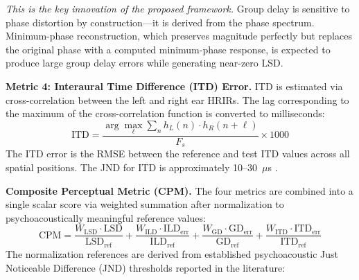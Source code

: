 \documentclass[12pt,a4paper]{article}
\begin{document}
\textit{This is the key innovation of the proposed framework.} Group delay is sensitive to phase distortion by construction---it is derived from the phase spectrum. Minimum-phase reconstruction, which preserves magnitude perfectly but replaces the original phase with a computed minimum-phase response, is expected to produce large group delay errors while generating near-zero LSD.

\textbf{Metric 4: Interaural Time Difference (ITD) Error.}
ITD is estimated via cross-correlation between the left and right ear HRIRs. The lag corresponding to the maximum of the cross-correlation function is converted to milliseconds:
\begin{equation}
\mathrm{ITD} = \frac{\arg\max_{\ell} \sum_n h_L(n) \cdot h_R(n + \ell)}{F_s} \times 1000
\label{eq:itd}
\end{equation}
The ITD error is the RMSE between the reference and test ITD values across all spatial positions. The JND for ITD is approximately 10--30~$\mu$s \cite{blauert1997}.

\textbf{Composite Perceptual Metric (CPM).}
The four metrics are combined into a single scalar score via weighted summation after normalization to psychoacoustically meaningful reference values:
\begin{equation}
\mathrm{CPM} = \frac{W_{\mathrm{LSD}} \cdot \mathrm{LSD}}{\mathrm{LSD}_{\mathrm{ref}}} + \frac{W_{\mathrm{ILD}} \cdot \mathrm{ILD}_{\mathrm{err}}}{\mathrm{ILD}_{\mathrm{ref}}} + \frac{W_{\mathrm{GD}} \cdot \mathrm{GD}_{\mathrm{err}}}{\mathrm{GD}_{\mathrm{ref}}} + \frac{W_{\mathrm{ITD}} \cdot \mathrm{ITD}_{\mathrm{err}}}{\mathrm{ITD}_{\mathrm{ref}}}
\label{eq:cpm}
\end{equation}
The normalization references are derived from established psychoacoustic Just Noticeable Difference (JND) thresholds reported in the literature:
\end{document}
